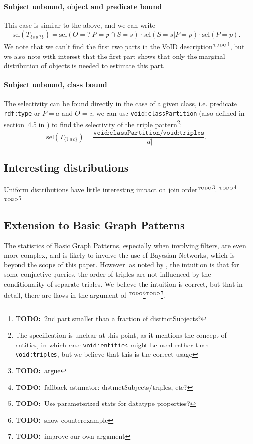 \documentclass[12pt, draft]{article}
\newcommand{\rdfterm}[1]{\texttt{#1}}
\newcommand{\todo}[1]{\ensuremath{^{\textrm{\tiny{TODO}\normalsize}}}\footnote{\textbf{TODO:}~#1}}
\newcommand{\sel}[1]{\ensuremath{\mathrm{sel}\left(#1\right)}}
\begin{document}
\paragraph{Subject unbound, object and predicate bound}

This case is similar to the above, and we can write 
\begin{equation}\label{eq:selsuunobpb}
\sel{T_{\{s~p~?\}}} = \sel{O = ? | P = p \cap S = s} \cdot 
\sel{S = s | P = p} \cdot
\sel{P = p} . 
\end{equation}
We note that we can't find the first two parts in the VoID
description\todo{2nd part smaller than a fraction of distinctSubjects?}, but we also note with interest that the first part shows
that only the marginal distribution of objects is needed to estimate
this part.

\paragraph{Subject unbound, class bound}

The selectivity can be found directly in the case of a given class,
i.e. predicate \rdfterm{rdf:type} or $P = a$ and $O = c$, we can use
\rdfterm{void:classPartition} (also defined in section~4.5 in
\cite{voidnote}) to find the selectivity of the triple
pattern\footnote{The specification is unclear at this point, as it
 mentions the concept of entities, in which case
 \rdfterm{void:entities} might be used rather than
 \rdfterm{void:triples}, but we believe that this is the correct usage}:
\begin{equation}\label{eq:selSvPaOc}
 \sel{T_{\{?~a~c\}}} =
    \frac{\rdfterm{void:classPartition/void:triples}}{|d|} .
\end{equation}

\subsection{Interesting distributions}

Uniform distributions have little interesting impact on join
order\todo{argue}. \todo{fallback estimator: distinctSubjects/triples, etc?}
\todo{Use parameterized stats for datatype properties?}

\subsection{Extension to Basic Graph Patterns}

The statistics of Basic Graph Patterns, especially when involving
filters, are even more complex, and is likely to involve the use of
Bayesian Networks, which is beyond the scope of this paper. However,
as noted by \cite{splendid}, the intuition is that for some conjuctive
queries, the order of triples are not influenced by the conditionality
of separate triples. We believe the intuition is correct, but that in
detail, there are flaws in the argument of \cite{splendid}\todo{show
  counterexample}\todo{improve our own argument}.
\end{document}
